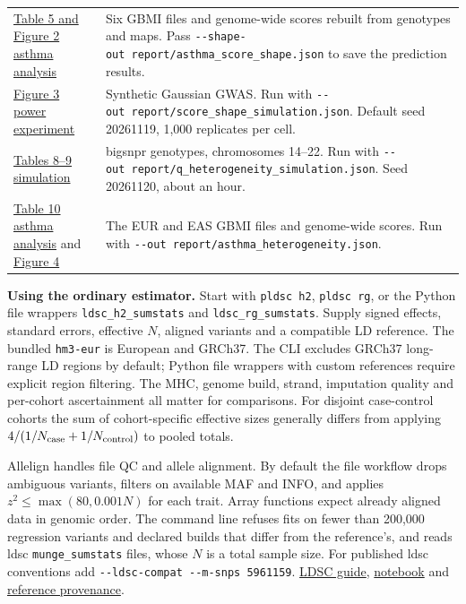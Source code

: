 \documentclass[11pt,a4paper]{article}
\begin{document}
\begin{longtable}[]{@{}
  >{\raggedright\arraybackslash}p{}
  >{\raggedright\arraybackslash}p{}@{}}
\href{../experiments/gbmi_asthma_casualty.py}{Table 5 and Figure 2 asthma analysis} & Six GBMI files and genome-wide scores rebuilt from genotypes and maps. Pass \texttt{-\/-shape-out\ report/asthma\_score\_shape.json} to save the prediction results. \\
\href{../experiments/score_shape_sim.py}{Figure 3 power experiment} & Synthetic Gaussian GWAS. Run with \texttt{-\/-out\ report/score\_shape\_simulation.json}. Default seed 20261119, 1,000 replicates per cell. \\
\href{../experiments/q_heterogeneity_sim.py}{Tables 8--9 simulation} & bigsnpr genotypes, chromosomes 14--22. Run with \texttt{-\/-out\ report/q\_heterogeneity\_simulation.json}. Seed 20261120, about an hour. \\
\href{../experiments/gbmi_asthma_heterogeneity.py}{Table 10 asthma analysis} and \href{reference_figure.py}{Figure 4} & The EUR and EAS GBMI files and genome-wide scores. Run with \texttt{-\/-out\ report/asthma\_heterogeneity.json}. \\
\end{longtable}

\textbf{Using the ordinary estimator.} Start with \texttt{pldsc\ h2}, \texttt{pldsc\ rg}, or the Python file wrappers \texttt{ldsc\_h2\_sumstats} and \texttt{ldsc\_rg\_sumstats}. Supply signed effects, standard errors, effective \(N\), aligned variants and a compatible LD reference. The bundled \texttt{hm3-eur} is European and GRCh37. The CLI excludes GRCh37 long-range LD regions by default; Python file wrappers with custom references require explicit region filtering. The MHC, genome build, strand, imputation quality and per-cohort ascertainment all matter for comparisons. For disjoint case-control cohorts the sum of cohort-specific effective sizes generally differs from applying \(4/(1/N_{\rm case}+1/N_{\rm control})\) to pooled totals.

Allelign handles file QC and allele alignment. By default the file workflow drops ambiguous variants, filters on available MAF and INFO, and applies \(z^2\leq\max(80,0.001N)\) for each trait. Array functions expect already aligned data in genomic order. The command line refuses fits on fewer than 200,000 regression variants and declared builds that differ from the reference's, and reads ldsc \texttt{munge\_sumstats} files, whose \(N\) is a total sample size. For published ldsc conventions add \texttt{-\/-ldsc-compat\ -\/-m-snps\ 5961159}. \href{../docs/LDSC.md}{LDSC guide}, \href{../examples/ldsc_notebook.ipynb}{notebook} and \href{../pldsc/data/hm3_eur.json}{reference provenance}.
\end{document}
